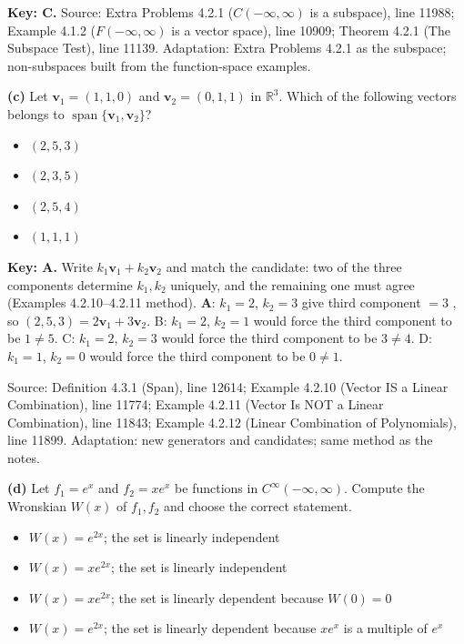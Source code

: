 \documentclass[11pt,a4paper]{article}
\newcommand{\Src}[1]{{\footnotesize\color{black!65}Source: #1}}
\begin{document}
\textbf{Key: C.} \Src{Extra Problems 4.2.1 ($C(-\infty,\infty)$ is a subspace), line 11988; Example 4.1.2 ($F(-\infty,\infty)$ is a vector space), line 10909; Theorem 4.2.1 (The Subspace Test), line 11139. Adaptation: Extra Problems 4.2.1 as the subspace; non-subspaces built from the function-space examples.}\par
{}\textbf{(c)} Let $\mathbf{v}_1=(1,1,0)$ and $\mathbf{v}_2=(0,1,1)$ in $\mathbb{R}^3$. Which of the following vectors belongs to $\operatorname{span}\{\mathbf{v}_1,\mathbf{v}_2\}$?\par
\begin{itemize}[leftmargin=8mm,itemsep=0pt]\item[A$^{\ast}$] $(2,5,3)$\item[B] $(2,3,5)$\item[C] $(2,5,4)$\item[D] $(1,1,1)$\end{itemize}
\textbf{Key: A.} Write $k_1\mathbf{v}_1+k_2\mathbf{v}_2$ and match the candidate: two of the three components determine $k_1,k_2$ uniquely, and the remaining one must agree (Examples 4.2.10--4.2.11 method). \textbf{A}: $k_1=2$, $k_2=3$ give third component $=3$ \checkmark, so $(2,5,3)=2\mathbf{v}_1+3\mathbf{v}_2$. B: $k_1=2$, $k_2=1$ would force the third component to be $1\neq5$. C: $k_1=2$, $k_2=3$ would force the third component to be $3\neq4$. D: $k_1=1$, $k_2=0$ would force the third component to be $0\neq1$.\par
\Src{Definition 4.3.1 (Span), line 12614; Example 4.2.10 (Vector IS a Linear Combination), line 11774; Example 4.2.11 (Vector Is NOT a Linear Combination), line 11843; Example 4.2.12 (Linear Combination of Polynomials), line 11899. Adaptation: new generators and candidates; same method as the notes.}\par
{}\textbf{(d)} Let $f_1=e^{x}$ and $f_2=xe^{x}$ be functions in $C^{\infty}(-\infty,\infty)$. Compute the Wronskian $W(x)$ of $f_1,f_2$ and choose the correct statement.\par
\begin{itemize}[leftmargin=8mm,itemsep=0pt]\item[A$^{\ast}$] $W(x)=e^{2x}$; the set is linearly independent\item[B] $W(x)=xe^{2x}$; the set is linearly independent\item[C] $W(x)=xe^{2x}$; the set is linearly dependent because $W(0)=0$\item[D] $W(x)=e^{2x}$; the set is linearly dependent because $xe^{x}$ is a multiple of $e^{x}$\end{itemize}
\end{document}
